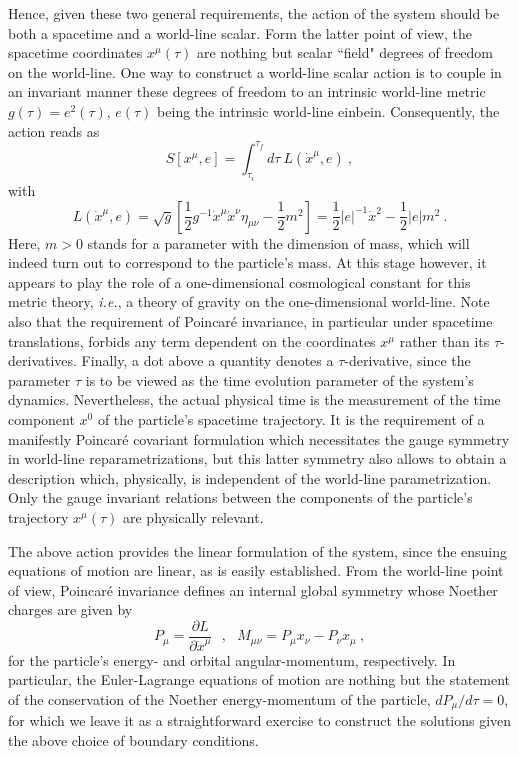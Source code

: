 \documentclass[a4paper,11pt]{article}
\begin{document}
Hence, given these two general requirements, the action of the system
should be both a spacetime and a world-line scalar. Form the latter
point of view, the spacetime coordinates $x^\mu(\tau)$ are nothing
but scalar ``field" degrees of freedom on the world-line. One way to
construct a world-line scalar action is to couple in an invariant
manner these degrees of freedom to an intrinsic world-line metric
$g(\tau)=e^2(\tau)$, $e(\tau)$ being the intrinsic world-line einbein.
Consequently, the action reads as
\begin{equation}
S[x^\mu,e]=\int_{\tau_i}^{\tau_f}d\tau\ L(\dot{x}^\mu,e)\ ,
\end{equation}
with
\begin{equation}
L(\dot{x}^\mu,e)=\sqrt{g}\left[\frac{1}{2}g^{-1}\dot{x}^\mu\dot{x}^\nu
\eta_{\mu\nu}-\frac{1}{2}m^2\right]=
\frac{1}{2}|e|^{-1}\dot{x}^2-\frac{1}{2}|e|m^2\ .
\end{equation}
Here, $m>0$ stands for a parameter with the dimension of mass, which
will indeed turn out to correspond to the particle's mass. At this stage
however, it appears to play the role of a one-dimensional cosmological
constant for this metric theory, {\it i.e.\/}, a theory of gravity on the 
one-dimensional world-line. Note also that the requirement of Poincar\'e 
invariance, in particular under spacetime translations, forbids any term 
dependent on the coordinates $x^\mu$ rather than its $\tau$-derivatives. 
Finally, a dot above a quantity denotes a $\tau$-derivative, since the 
parameter $\tau$ is to be viewed as the time evolution parameter of the 
system's dynamics. Nevertheless, the actual physical time is the measurement 
of the time component $x^0$ of the particle's spacetime trajectory. It is 
the requirement of a manifestly Poincar\'e covariant formulation which 
necessitates the gauge symmetry in world-line reparametrizations, but this
latter symmetry also allows to obtain a description which, physically, is 
independent of the world-line parametrization. Only the gauge invariant 
relations between the components of the particle's trajectory 
$x^\mu(\tau)$ are physically relevant.

The above action provides the linear formulation of the system, since the
ensuing equations of motion are linear, as is easily established.
From the world-line point of view, Poincar\'e invariance defines an
internal global symmetry whose Noether charges are given by
\begin{equation}
P_\mu=\frac{\partial L}{\partial\dot{x}^\mu}\ \ \ ,\ \ \ 
M_{\mu\nu}=P_\mu x_\nu-P_\nu x_\mu\ ,
\end{equation}
for the particle's energy- and orbital angular-momentum, respectively.
In particular, the Euler-Lagrange equations of motion are nothing but the 
statement of the conservation of the Noether energy-momentum of the particle, 
$dP_\mu/d\tau=0$, for which we leave it as a straightforward exercise to 
construct the solutions given the above choice of boundary conditions.
\end{document}

